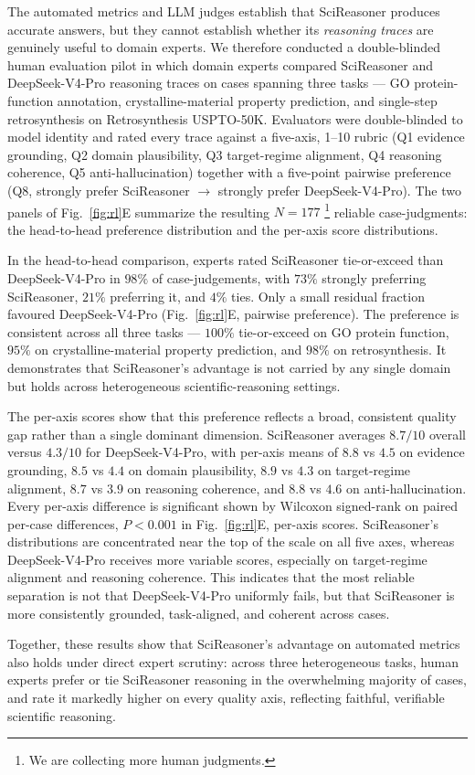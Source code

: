 The automated metrics and LLM judges establish that SciReasoner produces accurate answers, but they cannot establish whether its \emph{reasoning traces} are genuinely useful to domain experts. We therefore conducted a double-blinded human evaluation pilot in which domain experts compared SciReasoner and DeepSeek-V4-Pro reasoning traces on cases spanning three tasks --- GO protein-function annotation, crystalline-material property prediction, and single-step retrosynthesis on Retrosynthesis USPTO-50K. Evaluators were double-blinded to model identity and rated every trace against a five-axis, 1--10 rubric (Q1 evidence grounding, Q2 domain plausibility, Q3 target-regime alignment, Q4 reasoning coherence, Q5 anti-hallucination) together with a five-point pairwise preference (Q8, strongly prefer SciReasoner $\to$ strongly prefer DeepSeek-V4-Pro). The two panels of Fig.~\ref{fig:rl}E summarize the resulting $N=177$ \footnote{We are collecting more human judgments.} reliable case-judgments: the head-to-head preference distribution and the per-axis score distributions.

In the head-to-head comparison, experts rated SciReasoner tie-or-exceed than DeepSeek-V4-Pro in $98\%$ of case-judgements, with $73\%$ strongly preferring SciReasoner, $21\%$ preferring it, and $4\%$ ties. Only a small residual fraction favoured DeepSeek-V4-Pro (Fig.~\ref{fig:rl}E, pairwise preference). 
The preference is consistent across all three tasks --- $100\%$ tie-or-exceed on GO protein function, $95\%$ on crystalline-material property prediction, and $98\%$ on retrosynthesis. It demonstrates that SciReasoner's advantage is not carried by any single domain but holds across heterogeneous scientific-reasoning settings. 

The per-axis scores show that this preference reflects a broad, consistent quality gap rather than a single dominant dimension. SciReasoner averages $8.7/10$ overall versus $4.3/10$ for DeepSeek-V4-Pro, with per-axis means of $8.8$ vs $4.5$ on evidence grounding, $8.5$ vs $4.4$ on domain plausibility, $8.9$ vs $4.3$ on target-regime alignment, $8.7$ vs $3.9$ on reasoning coherence, and $8.8$ vs $4.6$ on anti-hallucination. 
Every per-axis difference is significant shown by Wilcoxon signed-rank on paired per-case differences, $P<0.001$ in Fig.~\ref{fig:rl}E, per-axis scores. 
SciReasoner's distributions are concentrated near the top of the scale on all five axes, whereas DeepSeek-V4-Pro receives more variable scores, especially on target-regime alignment and reasoning coherence. This indicates that the most reliable separation is not that DeepSeek-V4-Pro uniformly fails, but that SciReasoner is more consistently grounded, task-aligned, and coherent across cases.

Together, these results show that SciReasoner's advantage on automated metrics also holds under direct expert scrutiny: across three heterogeneous tasks, human experts prefer or tie SciReasoner reasoning in the overwhelming majority of cases, and rate it markedly higher on every quality axis, reflecting faithful, verifiable scientific reasoning.
